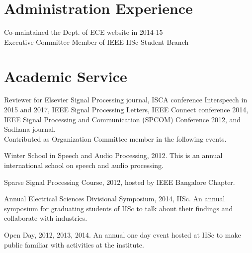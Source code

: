 \documentclass[line]{resume}
\begin{document}
{\begin{resume}
    \section{\mysidestyle Administration Experience}
    \vspace{2.5mm}
    Co-maintained the Dept. of ECE website in 2014-15 \vspace{1mm}\\
    Executive Committee Member of IEEE-IISc Student Branch
    \vspace{-3.5mm}
    \section{\mysidestyle Academic Service}
    \vspace{2.5mm}
    Reviewer for Elsevier Signal Processing journal, ISCA conference Interspeech in 2015 and 2017,
    IEEE Signal Processing Letters, IEEE Connect conference 2014, IEEE Signal Processing and Communication (SPCOM) Conference 2012, and Sadhana journal.\vspace{1mm}\\
    Contributed as Organization Committee member in the following events. 
    \begin{list2}
     \item Winter School in Speech and Audio Processing, 2012. This is an annual international school on speech and audio processing.
     \item Sparse Signal Processing Course, 2012, hosted by IEEE Bangalore Chapter.
     \item Annual Electrical Sciences Divisional Symposium, 2014, IISc. An annual symposium for graduating students of IISc to talk
     about their findings and collaborate with industries.
     \item Open Day, 2012, 2013, 2014. An annual one day event hosted at IISc to make public familiar with activities at the institute.
    \end{list2}
\newpage

\end{resume}}
\end{document}
